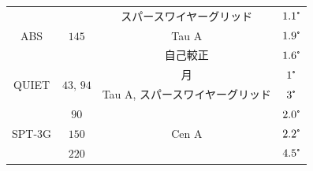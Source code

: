\documentclass[../../main.tex]{subfiles}
\begin{document}
\begin{table}[H]
\begin{tabular}{cccc}
        \hline
        \multirow{3}{*}{ABS\cite{so:Kusaka_2018}} & \multirow{3}{*}{$145$} & スパースワイヤーグリッド & $1.1\tcdegree$ \\
                                                  &                        & Tau A & $1.9\tcdegree$ \\
                                                  &                        & 自己較正 & $1.6\tcdegree$ \\
        \hline
        \multirow{2}{*}{QUIET\cite{so:Bischoff_2011}} & \multirow{2}{*}{$43,\,94$} & 月 & $1\tcdegree$ \\
                                                      &                            & Tau A, スパースワイヤーグリッド & $3\tcdegree$ \\
        \hline
        \multirow{3}{*}{SPT-3G\cite{so:SPT3G}} & $90$  & \multirow{3}{*}{Cen A} & $2.0\tcdegree$ \\
                                               & $150$ &                        & $2.2\tcdegree$ \\
                                               & $220$ &                        & $4.5\tcdegree$ \\
        \hline
    \end{tabular}
    \label{tab:so-polarization_calibration}
\end{table}
\end{document}

